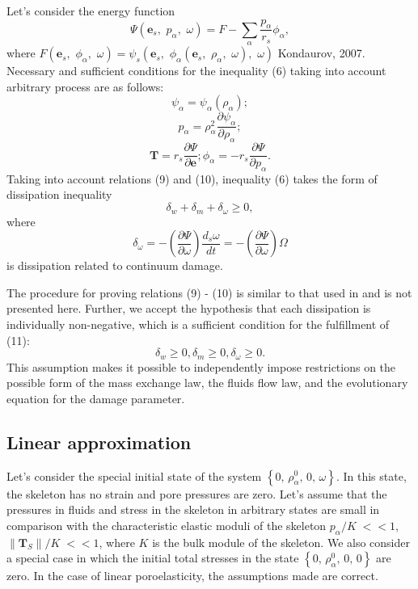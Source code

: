 \documentclass[article,authoryear,jpm]{beg_39}             %
\begin{document}
Let’s consider the energy function $$\Psi \left( {{\mathbf{e}}_{s}},\,\,{{p}_{\alpha }},\,\,\omega \right)=F-\sum\limits_{\alpha }{\frac{{{p}_{\alpha }}}{{{r}_{s}}}{{\phi }_{\alpha }}},$$ where $F\left( {{\mathbf{e}}_{s}},\,\,{{\phi }_{\alpha }},\,\,\omega \right)={{\psi }_{s}}\left( {{\mathbf{e}}_{s}},\,\,{{\phi }_{\alpha }}\left( {{\mathbf{e}}_{s}},\,\,{{\rho }_{\alpha }},\,\,\omega \right),\,\,\omega \right)$ Kondaurov, 2007. Necessary and sufficient conditions for the inequality (6) taking into account arbitrary process are as follows:
\begin{equation}
{{\psi }_{\alpha }}={{\psi }_{\alpha }}\left( {{\rho }_{\alpha }} \right); 
\end{equation}
\begin{equation}
{{p}_{\alpha }}=\rho _{\alpha }^{2}\frac{\partial {{\psi }_{\alpha }}}{\partial {{\rho }_{\alpha }}};
\end{equation}
\begin{equation}
\mathbf{T}={{r}_{s}}\frac{\partial \Psi }{\partial \mathbf{e}}; {{\phi }_{\alpha }}=-{{r}_{s}}\frac{\partial \Psi }{\partial {{p}_{\alpha }}}.
\end{equation}
Taking into account relations (9) and (10), inequality (6) takes the form of dissipation inequality
\begin{equation}
{{\delta }_{w}}+{{\delta }_{m}}+{{\delta }_{\omega }}\ge 0,
\end{equation}
where $${{\delta }_{\omega }}=-\left( \frac{\partial \Psi }{\partial \omega } \right)\frac{{{d}_{s}}\omega }{dt}=-\left( \frac{\partial \Psi }{\partial \omega } \right)\Omega$$ is dissipation related to continuum damage.

The procedure for proving relations (9) - (10) is similar to that used in \cite{Truesdell, Kondaurov2007} and is not presented here.
Further, we accept the hypothesis that each dissipation is individually non-negative, which is a sufficient condition for the fulfillment of (11):
\begin{equation}
{{\delta }_{w}}\ge 0, {{\delta }_{m}}\ge 0, {{\delta }_{\omega }}\ge 0.
\end{equation}
This assumption makes it possible to independently impose restrictions on the possible form of the mass exchange law, the fluids flow law, and the evolutionary equation for the damage parameter.
\subsection{Linear approximation}
Let’s consider the special initial state of the system
$\left\{ 0,\,\rho _{\alpha }^{0},\,0,\,\omega \right\}$.
In this state, the skeleton has no strain and pore pressures are zero.
Let’s assume that the pressures in fluids and stress in the skeleton in arbitrary states are small in comparison with the characteristic elastic moduli of the skeleton
${{{p}_{\alpha }}}/{K}\;<<1$, ${\left\| {{\mathbf{T}}_{S}} \right\|}/{K}\;<<1$,
where $K$ is the bulk module of the skeleton. We also consider a special case in which the initial total stresses in the state
$\left\{ 0,\,\rho _{\alpha }^{0},\,0,\,0 \right\}$
are zero. In the case of linear poroelasticity, the assumptions made are correct.
\end{document}
